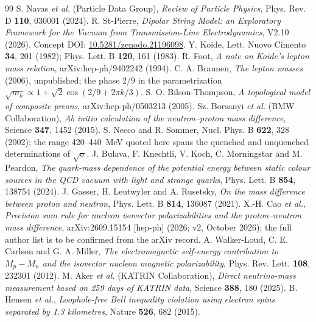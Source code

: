 \documentclass[11pt,a4paper]{article}
\theoremstyle{plain}
\theoremstyle{remark}
\begin{document}
\begin{thebibliography}{99}
 S. Navas \textit{et al.} (Particle Data Group), \textit{Review of Particle Physics}, Phys. Rev. D \textbf{110}, 030001 (2024).
 R. St-Pierre, \textit{Dipolar String Model: an Exploratory Framework for the Vacuum from Transmission-Line Electrodynamics}, V2.10 (2026). Concept DOI: \href{https://doi.org/10.5281/zenodo.21196098}{10.5281/zenodo.21196098}.
 Y. Koide, Lett. Nuovo Cimento \textbf{34}, 201 (1982); Phys. Lett. B \textbf{120}, 161 (1983).
 R. Foot, \textit{A note on Koide's lepton mass relation}, arXiv:hep-ph/9402242 (1994).
 C. A. Brannen, \textit{The lepton masses} (2006), unpublished; the phase $2/9$ in the parametrization $\sqrt{m_k} \propto 1 + \sqrt2\cos(2/9 + 2\pi k/3)$.
 S. O. Bilson-Thompson, \textit{A topological model of composite preons}, arXiv:hep-ph/0503213 (2005).
 Sz. Borsanyi \textit{et al.} (BMW Collaboration), \textit{Ab initio calculation of the neutron--proton mass difference}, Science \textbf{347}, 1452 (2015).
 S. Necco and R. Sommer, Nucl. Phys. B \textbf{622}, 328 (2002); the range 420--440~MeV quoted here spans the quenched and unquenched determinations of $\sqrt\sigma$.
 J. Bulava, F. Knechtli, V. Koch, C. Morningstar and M. Peardon, \textit{The quark-mass dependence of the potential energy between static colour sources in the QCD vacuum with light and strange quarks}, Phys. Lett. B \textbf{854}, 138754 (2024).
 J. Gasser, H. Leutwyler and A. Rusetsky, \textit{On the mass difference between proton and neutron}, Phys. Lett. B \textbf{814}, 136087 (2021).
 X.-H. Cao \textit{et al.}, \textit{Precision sum rule for nucleon isovector polarizabilities and the proton--neutron mass difference}, arXiv:2609.15154 [hep-ph] (2026; v2, October 2026); the full author list is to be confirmed from the arXiv record.
 A. Walker-Loud, C. E. Carlson and G. A. Miller, \textit{The electromagnetic self-energy contribution to $M_p - M_n$ and the isovector nucleon magnetic polarizability}, Phys. Rev. Lett. \textbf{108}, 232301 (2012).
 M. Aker \textit{et al.} (KATRIN Collaboration), \textit{Direct neutrino-mass measurement based on 259 days of KATRIN data}, Science \textbf{388}, 180 (2025).
 B. Hensen \textit{et al.}, \textit{Loophole-free Bell inequality violation using electron spins separated by 1.3 kilometres}, Nature \textbf{526}, 682 (2015).

\end{thebibliography}
\end{document}
